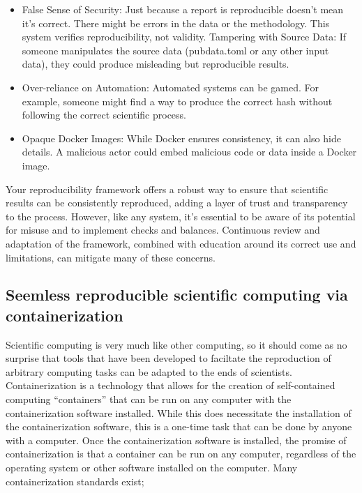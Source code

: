 \begin{itemize}
\itemsep -0.2em
\item False Sense of Security: Just because a report is reproducible doesn't mean it's correct. There might be errors in the data or the methodology. This system verifies reproducibility, not validity.
Tampering with Source Data: If someone manipulates the source data (pubdata.toml or any other input data), they could produce misleading but reproducible results.
\item Over-reliance on Automation: Automated systems can be gamed. For example, someone might find a way to produce the correct hash without following the correct scientific process.
\item Opaque Docker Images: While Docker ensures consistency, it can also hide details. A malicious actor could embed malicious code or data inside a Docker image.
\end{itemize}

Your reproducibility framework offers a robust way to ensure that scientific results can be consistently reproduced, adding a layer of trust and transparency to the process. However, like any system, it's essential to be aware of its potential for misuse and to implement checks and balances. Continuous review and adaptation of the framework, combined with education around its correct use and limitations, can mitigate many of these concerns.

\hypertarget{seemless-reproducible-scientific-computing-via-containerization}{%
\subsection{Seemless reproducible scientific computing via containerization}\label{seemless-reproducible-scientific-computing-via-containerization}}

Scientific computing is very much like other computing, so it should come as no surprise that tools that have been developed to faciltate the reproduction of arbitrary computing tasks can be adapted to the ends of scientists. Containerization is a technology that allows for the creation of self-contained computing ``containers'' that can be run on any computer with the containerization software installed. While this does necessitate the installation of the containerization software, this is a one-time task that can be done by anyone with a computer. Once the containerization software is installed, the promise of containerization is that a container can be run on any computer, regardless of the operating system or other software installed on the computer. Many containerization standards exist; 

